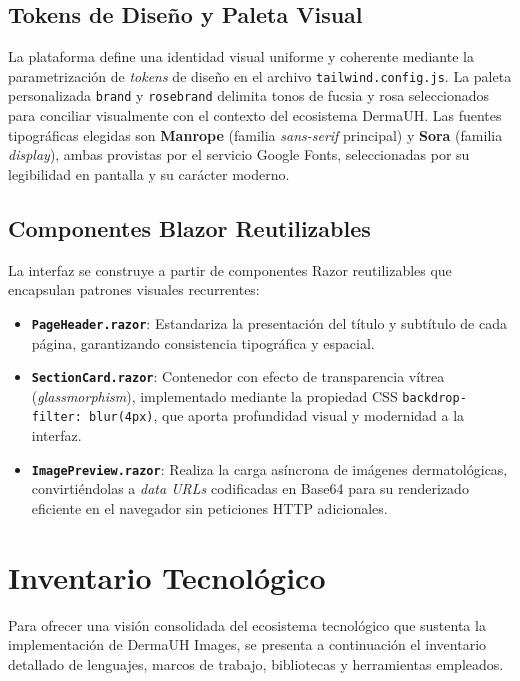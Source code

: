 \subsection{Tokens de Diseño y Paleta Visual}
La plataforma define una identidad visual uniforme y coherente mediante la parametrización 
de \textit{tokens} de diseño en el archivo \texttt{tailwind.config.js}. La paleta personalizada 
\texttt{brand} y \texttt{rosebrand} delimita tonos de fucsia y rosa seleccionados para conciliar 
visualmente con el contexto del ecosistema DermaUH. Las fuentes 
tipográficas elegidas son \textbf{Manrope} (familia \textit{sans-serif} principal) y \textbf{Sora} 
(familia \textit{display}), ambas provistas por el servicio Google Fonts, seleccionadas por su 
legibilidad en pantalla y su carácter moderno.

\subsection{Componentes Blazor Reutilizables}
La interfaz se construye a partir de componentes Razor reutilizables que encapsulan patrones visuales 
recurrentes:

\begin{itemize}
    \item \textbf{\texttt{PageHeader.razor}}: Estandariza la presentación del título y subtítulo de cada 
    página, garantizando consistencia tipográfica y espacial.
    \item \textbf{\texttt{SectionCard.razor}}: Contenedor con efecto de transparencia vítrea 
    (\textit{glassmorphism}), implementado mediante la propiedad CSS \texttt{backdrop-filter: blur(4px)}, 
    que aporta profundidad visual y modernidad a la interfaz.
    \item \textbf{\texttt{ImagePreview.razor}}: Realiza la carga asíncrona de imágenes dermatológicas, 
    convirtiéndolas a \textit{data URLs} codificadas en Base64 para su renderizado eficiente en el navegador 
    sin peticiones HTTP adicionales.
\end{itemize}

\section{Inventario Tecnológico}
Para ofrecer una visión consolidada del ecosistema tecnológico que sustenta la implementación de 
DermaUH Images, se presenta a continuación el inventario detallado de lenguajes, marcos de trabajo, 
bibliotecas y herramientas empleados.


